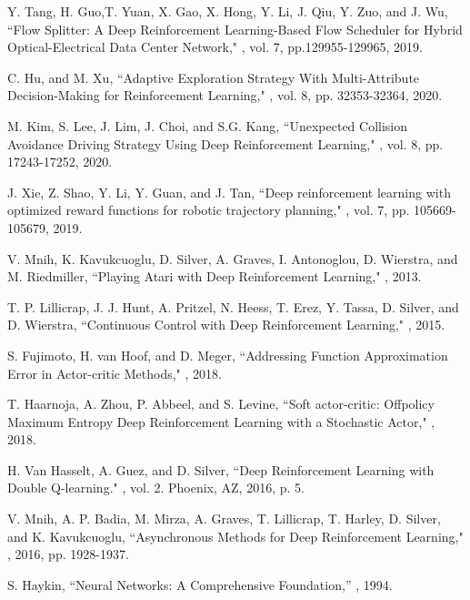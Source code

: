\documentclass{ieeeaccess}
\begin{document}
\begin{thebibliography}{46}
Y. Tang, H. Guo,T. Yuan, X. Gao, X. Hong, Y. Li, J. Qiu, Y. Zuo, and J. Wu,
\newblock ``Flow Splitter: A Deep Reinforcement Learning-Based Flow Scheduler for Hybrid Optical-Electrical Data Center Network,"
, vol. 7, pp.129955-129965, 2019.

C. Hu, and M. Xu,
\newblock ``Adaptive Exploration Strategy With Multi-Attribute Decision-Making for Reinforcement Learning,"
, vol. 8, pp. 32353-32364, 2020.

M. Kim, S. Lee, J. Lim, J. Choi, and S.G. Kang,
\newblock ``Unexpected Collision Avoidance Driving Strategy Using Deep Reinforcement Learning,"
, vol. 8, pp. 17243-17252, 2020.


J. Xie, Z. Shao, Y. Li, Y. Guan, and J. Tan,
\newblock ``Deep reinforcement learning with optimized reward functions for robotic trajectory planning,"
, vol. 7, pp. 105669-105679, 2019.

V. Mnih, K. Kavukcuoglu, D. Silver, A. Graves, I. Antonoglou, D. Wierstra, and M. Riedmiller,
\newblock ``Playing Atari with Deep Reinforcement Learning,"
, 2013.

 T. P. Lillicrap, J. J. Hunt, A. Pritzel, N. Heess, T. Erez, Y. Tassa, D. Silver, and D. Wierstra,
\newblock ``Continuous Control with Deep Reinforcement Learning,"
, 2015.


 S. Fujimoto, H. van Hoof, and D. Meger,
\newblock ``Addressing Function Approximation Error in Actor-critic Methods,"
, 2018.

T. Haarnoja, A. Zhou, P. Abbeel, and S. Levine,
\newblock ``Soft actor-critic: Offpolicy Maximum Entropy Deep Reinforcement Learning with a Stochastic Actor,"
, 2018.

 H. Van Hasselt, A. Guez, and D. Silver,
 ``Deep Reinforcement Learning with Double Q-learning."
 , vol. 2. Phoenix, AZ, 2016, p. 5.

 V. Mnih, A. P. Badia, M. Mirza, A. Graves, T. Lillicrap, T. Harley, D. Silver, and K. Kavukcuoglu,
\newblock ``Asynchronous Methods for Deep Reinforcement Learning,"
, 2016, pp. 1928-1937.

 S. Haykin,
\newblock ``Neural Networks: A Comprehensive Foundation,''
, 1994.


\end{thebibliography}
\end{document}
